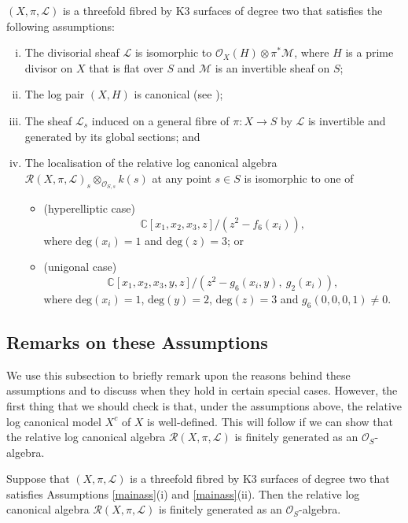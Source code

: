\documentclass{amsart}
\begin{document}
\begin{assumption} \label{mainass} $(X,\pi,{\mathcal{L}})$ is a threefold fibred by K3 surfaces of degree two that satisfies the following assumptions:
\begin{enumerate}[(i)]
\item The divisorial sheaf ${\mathcal{L}}$ is isomorphic to ${\mathcal{O}}_X(H) \otimes \pi^*{\mathcal{M}}$, where $H$ is a prime divisor on $X$ that is flat over $S$ and ${\mathcal{M}}$ is an invertible sheaf on $S$;  
\item The log pair $(X,H)$ is canonical  (see \cite[Definition 2.34]{bgav});
\item The sheaf ${\mathcal{L}}_s$ induced on a general fibre of $\pi\colon X \to S$ by ${\mathcal{L}}$ is invertible and generated by its global sections; and
\item The localisation of the relative log canonical algebra ${\mathcal{R}}(X,\pi,{\mathcal{L}})_s \otimes_{{\mathcal{O}}_{S,s}} k(s)$ at any point $s \in S$ is isomorphic to one of
\begin{itemize}
\item (hyperelliptic case)
\[ {\mathbb{C}}[x_1,x_2,x_3,z]/(z^2 - f_6(x_i)),\]
where $\mathrm{deg}(x_i) = 1$ and $\mathrm{deg}(z) = 3$; or
\item (unigonal case)
\[ {\mathbb{C}}[x_1,x_2,x_3,y,z]/(z^2 - g_6(x_i,y),\ g_2(x_i)),\]
where $\mathrm{deg}(x_i)= 1$, $\mathrm{deg}(y)=2$, $\mathrm{deg}(z) = 3$ and $g_6(0,0,0,1) \neq 0$. 
\end{itemize}
\end{enumerate}
\end{assumption}

\subsection{Remarks on these Assumptions}

We use this subsection to briefly remark upon the reasons behind these assumptions and to discuss when they hold in certain special cases. However, the first thing that we should check is that, under the assumptions above, the relative log canonical model $X^c$ of $X$ is well-defined. This will follow if we can show that the relative log canonical algebra ${\mathcal{R}}(X,\pi,{\mathcal{L}})$ is finitely generated as an ${\mathcal{O}}_S$-algebra.

\begin{lemma} \label{fingen} Suppose that $(X,\pi,{\mathcal{L}})$ is a threefold fibred by K3 surfaces of degree two that satisfies Assumptions \ref{mainass}\textup{(}i\textup{)} and \ref{mainass}\textup{(}ii\textup{)}. Then the relative log canonical algebra ${\mathcal{R}}(X,\pi,{\mathcal{L}})$ is finitely generated as an ${\mathcal{O}}_S$-algebra. \end{lemma} 
\end{document}
